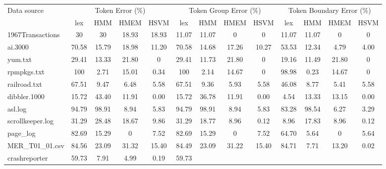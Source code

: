 \begin{table}
\begin{center}
\begin{tabular}{|l||c|c|c|c||c|c|c|c||c|c|c|c|} \hline
Data source        & \multicolumn{4}{|c||}{Token Error (\%)} &
               \multicolumn{4}{|c||}{Token Group Error (\%)} &
               \multicolumn{4}{|c|}{Token Boundary Error (\%)} \\ \cline{2-13}
               & lex   & HMM   & HMEM  & HSVM & lex & HMM & HMEM &
               HSVM & lex & HMM & HMEM & HSVM \\\hline\hline
1967Transactions     & 30    & 30    & 18.93 & 18.93 & 11.07 &
               11.07 & 0     & 0     & 11.07 & 11.07 & 0     & 0     \\ \hline
ai.3000                    & 70.58 & 15.79 & 18.98 & 11.20 & 70.58 &
               14.68 & 17.26 & 10.27 & 53.53 & 12.34 & 4.79  & 4.00  \\ \hline
yum.txt                    & 29.41 & 13.33 & 21.80 & 0     & 29.41 &
               11.73 & 21.80 & 0     & 19.16 & 11.49 & 21.80 & 0     \\ \hline
rpmpkgs.txt                & 100   & 2.71  & 15.01 & 0.34  & 100   &
               2.14  & 14.67     & 0     & 98.98 & 0.23  & 14.67     & 0     \\ \hline
railroad.txt               & 67.51 & 9.47  & 6.48  & 5.58     &
67.51 &
               9.36  & 5.93  & 5.58     & 46.08 & 8.77  & 5.41  & 5.58     \\ \hline
dibbler.1000               & 15.72 & 43.40     & 11.91     & 0.00 &
15.72 & 36.78
                     & 11.91     & 0.00     & 4.54  & 13.33 & 13.15     & 0.00     \\ \hline
asl.log                    & 94.79 & 98.91 & 8.94  & 5.83  & 94.79 &
               98.91 & 8.94  & 5.83  & 83.28 & 98.54 & 6.27  & 3.29  \\ \hline
scrollkeeper.log           & 31.29 & 28.48 & 18.67 & 9.86  & 31.29 &
               18.77 & 8.96  & 0.12  & 8.96  & 17.83 & 8.96  & 0.12  \\ \hline
page\_log                  & 82.69 & 15.29 & 0     & 7.52  & 82.69 &
               15.29 & 0     & 7.52  & 64.70 & 5.64  & 0     & 5.64  \\ \hline
MER\_T01\_01.csv           & 84.56 & 23.09 & 31.32 & 15.40     &
84.49 &
               23.09 & 31.22 & 15.40     & 84.71 & 7.71  & 13.20 & 0.02 \\ \hline
crashreporter          & 59.73 & 7.91     & 4.99  & 0.19  & 59.73 &

\end{tabular}
\end{center}
\end{table}
